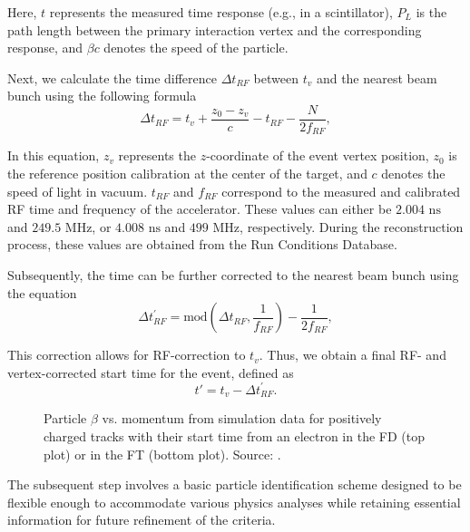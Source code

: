     Here, $t$ represents the measured time response (e.g., in a scintillator), $P_L$ is the path length between the primary interaction vertex and the corresponding response, and $\beta c$ denotes the speed of the particle.

    Next, we calculate the time difference $\Delta t_{RF}$ between $t_v$ and the nearest beam bunch using the following formula
    \begin{equation*}
        \Delta t_{RF} = t_v + \frac{z_0 - z_v}{c} - t_{RF} - \frac{N}{2f_{RF}},
    \end{equation*}

    In this equation, $z_v$ represents the $z$-coordinate of the event vertex position, $z_0$ is the reference position calibration at the center of the target, and $c$ denotes the speed of light in vacuum.
    $t_{RF}$ and $f_{RF}$ correspond to the measured and calibrated RF time and frequency of the accelerator.
    These values can either be $2.004 \text{ ns}$ and $249.5 \text{ MHz}$, or $4.008 \text{ ns}$ and $499 \text{ MHz}$, respectively.
    During the reconstruction process, these values are obtained from the Run Conditions Database.

    Subsequently, the time can be further corrected to the nearest beam bunch using the equation
    \begin{equation*}
        \Delta t^\prime_{RF} = \text{mod}\left(\Delta t_{RF}, \frac{1}{f_{RF}}\right) - \frac{1}{2f_{RF}},
    \end{equation*}

    This correction allows for RF-correction to $t_v$. Thus, we obtain a final RF- and vertex-corrected start time for the event, defined as
    \begin{equation*}
        t' = t_v - \Delta t^\prime_{RF}.
    \end{equation*}

    \begin{wrapfigure}{r}{0.49\textwidth}
        \centering{}
        \caption[Particle $\beta$ vs. momentum for positively charged tracks.]{Particle $\beta$ vs. momentum from simulation data for positively charged tracks with their start time from an electron in the FD (top plot) or in the FT (bottom plot).
        Source: \cite{ziegler2020}.}
        \label{fig::11.232::positive_pid}
    \end{wrapfigure}

    The subsequent step involves a basic particle identification scheme designed to be flexible enough to accommodate various physics analyses while retaining essential information for future refinement of the criteria.

